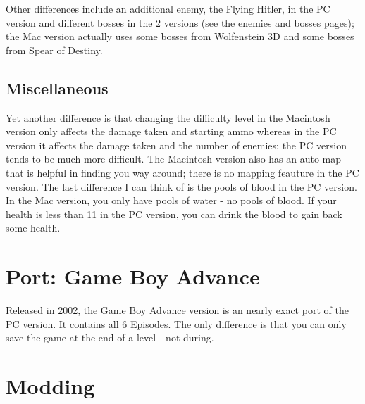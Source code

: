 \documentclass[book.tex]{subfiles}
\begin{document}
Other differences include an additional enemy, the Flying Hitler, in the PC version and different bosses in the 2 versions (see the enemies and bosses pages); the Mac version actually uses some bosses from Wolfenstein 3D and some bosses from Spear of Destiny.

\subsection{Miscellaneous}

Yet another difference is that changing the difficulty level in the Macintosh version only affects the damage taken and starting ammo whereas in the PC version it affects the damage taken and the number of enemies; the PC version tends to be much more difficult. The Macintosh version also has an auto-map that is helpful in finding you way around; there is no mapping feauture in the PC version.
The last difference I can think of is the pools of blood in the PC version. In the Mac version, you only have pools of water - no pools of blood. If your health is less than 11 in the PC version, you can drink the blood to gain back some health.



\section{Port: Game Boy Advance}
Released in 2002, the Game Boy Advance version is an nearly exact port of the PC version. It contains all 6 Episodes. The only difference is that you can only save the game at the end of a level - not during.

\section{Modding}
\end{document}
